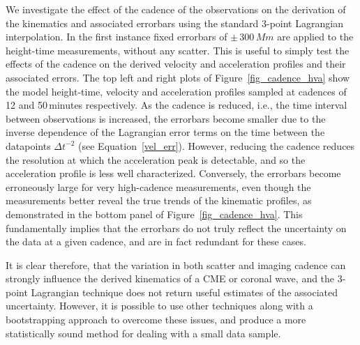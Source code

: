 \documentclass[structabstract]{aa}
\begin{document}
We investigate the effect of the cadence of the observations on the derivation of the kinematics and associated errorbars using the standard 3-point Lagrangian interpolation. In the first instance fixed errorbars of $\pm\,300\,Mm$ are applied to the height-time measurements, without any scatter. This is useful to simply test the effects of the cadence on the derived velocity and acceleration profiles and their associated errors. The top left and right plots of Figure~\ref{fig_cadence_hva} show the model height-time, velocity and acceleration profiles sampled at cadences of 12 and 50\,minutes respectively. As the cadence is reduced, i.e., the time interval between observations is increased, the errorbars become smaller due to the inverse dependence of the Lagrangian error terms on the time between the datapoints $\Delta t^{-2}$ (see Equation~\ref{vel_err}). However, reducing the cadence reduces the resolution at which the acceleration peak is detectable, and so the acceleration profile is less well characterized. Conversely, the errorbars become erroneously large for very high-cadence measurements, even though the measurements better reveal the true trends of the kinematic profiles, as demonstrated in the bottom panel of Figure~\ref{fig_cadence_hva}. This fundamentally implies that the errorbars do not truly reflect the uncertainty on the data at a given cadence, and are in fact redundant for these cases.



It is clear therefore, that the variation in both scatter and imaging cadence can strongly influence the derived kinematics of a CME or coronal wave, and the 3-point Lagrangian technique does not return useful estimates of the associated uncertainty. However, it is possible to use other techniques along with a bootstrapping approach to overcome these issues, and produce a more statistically sound method for dealing with a small data sample. 
\end{document}
